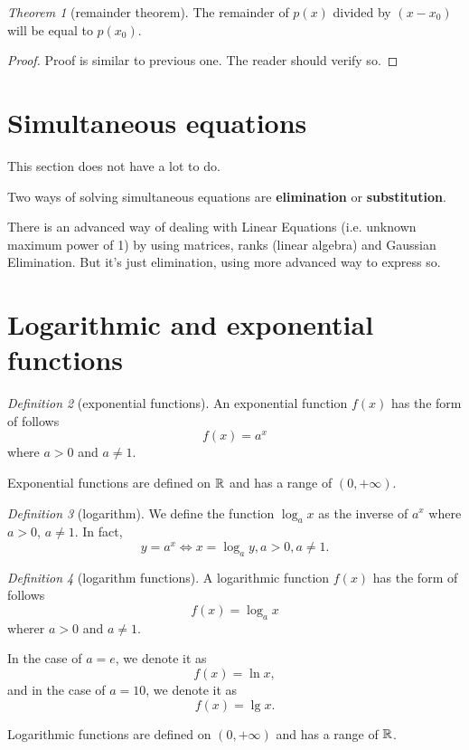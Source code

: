 \documentclass[8pt]{article}
\theoremstyle{remark}
\newtheorem{theorem}{Theorem}[section]
\newtheorem{definition}[theorem]{Definition}
\begin{document}
        \begin{theorem}[remainder theorem]
            The remainder of $p(x)$ divided by $(x - x_0)$ will be equal to $p(x_0)$.

            \begin{proof}
                Proof is similar to previous one. The reader should verify so.
            \end{proof}
        \end{theorem}

    \section{Simultaneous equations}
        
        This section does not have a lot to do.

        Two ways of solving simultaneous equations are \textbf{elimination} or \textbf{substitution}.

        There is an advanced way of dealing with Linear Equations (i.e. unknown maximum power of 1) by using matrices, ranks (linear algebra) and Gaussian Elimination. But it's just elimination, using more advanced way to express so.
    
    \section{Logarithmic and exponential functions}
        \begin{definition}[exponential functions]
            An exponential function $f(x)$ has the form of follows
            $$
                f(x) = a^x
            $$
            where $a > 0$ and $a \neq 1$.

            Exponential functions are defined on $\mathbb{R}$ and has a range of $(0, +\infty)$.
        \end{definition}

        \begin{definition}[logarithm]
            We define the function $\log_a x$ as the inverse of $a^x$ where $a > 0$, $a \neq 1$. In fact,
            $$
                y = a^x \iff x = \log_a y, a > 0, a \neq 1.
            $$
        \end{definition}

        \begin{definition}[logarithm functions]
            A logarithmic function $f(x)$ has the form of follows
            $$
                f(x) = \log_a x
            $$ 
            wherer $a > 0$ and $a \neq 1$.

            In the case of $a = e$, we denote it as
            $$
                f(x) = \ln x,
            $$
            and in the case of $a = 10$, we denote it as
            $$
                f(x) = \lg x.
            $$

            Logarithmic functions are defined on $(0, +\infty)$ and has a range of $\mathbb{R}$.
        \end{definition}
    
\end{document}
